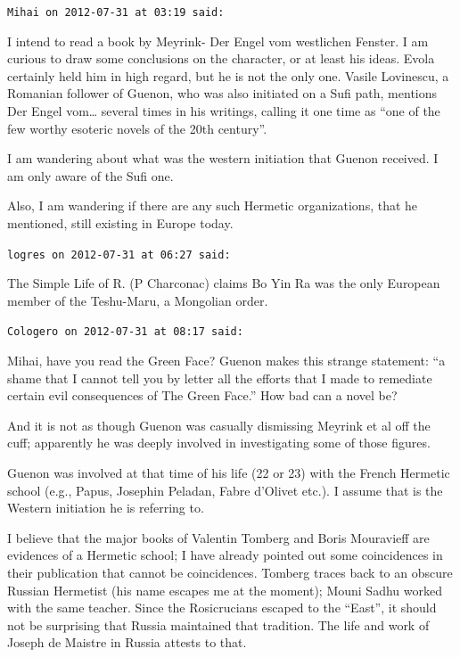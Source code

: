 \begin{footnotesize}\begin{sffamily}

\texttt{Mihai on 2012-07-31 at 03:19 said: }

I intend to read a book by Meyrink- Der Engel vom westlichen Fenster. I am curious to draw some conclusions on the character, or at least his ideas. Evola certainly held him in high regard, but he is not the only one. Vasile Lovinescu, a Romanian follower of Guenon, who was also initiated on a Sufi path, mentions Der Engel vom… several times in his writings, calling it one time as “one of the few worthy esoteric novels of the 20th century”. 

I am wandering about what was the western initiation that Guenon received. I am only aware of the Sufi one.

Also, I am wandering if there are any such Hermetic organizations, that he mentioned, still existing in Europe today.


\hfill

\texttt{logres on 2012-07-31 at 06:27 said: }

The Simple Life of R. (P Charconac) claims Bo Yin Ra was the only European member of the Teshu-Maru, a Mongolian order.


\hfill

\texttt{Cologero on 2012-07-31 at 08:17 said: }

Mihai, have you read the Green Face? Guenon makes this strange statement: “a shame that I cannot tell you by letter all the efforts that I made to remediate certain evil consequences of The Green Face.” How bad can a novel be?

And it is not as though Guenon was casually dismissing Meyrink et al off the cuff; apparently he was deeply involved in investigating some of those figures.

Guenon was involved at that time of his life (22 or 23) with the French Hermetic school (e.g., Papus, Josephin Peladan, Fabre d'Olivet etc.). I assume that is the Western initiation he is referring to.

I believe that the major books of Valentin Tomberg and Boris Mouravieff are evidences of a Hermetic school; I have already pointed out some coincidences in their publication that cannot be coincidences. Tomberg traces back to an obscure Russian Hermetist (his name escapes me at the moment); Mouni Sadhu worked with the same teacher. Since the Rosicrucians escaped to the “East”, it should not be surprising that Russia maintained that tradition. The life and work of Joseph de Maistre in Russia attests to that.



\end{sffamily}
\end{footnotesize}
